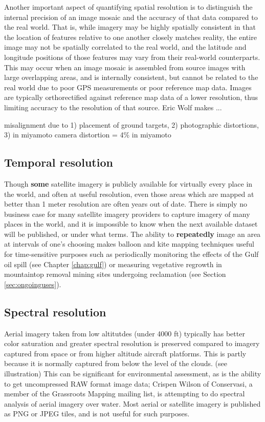 \documentclass[11pt]{report}
\begin{document}
Another important aspect of quantifying spatial resolution is to distinguish the internal precision of an image mosaic and the accuracy of that data compared to the real world. That is, while imagery may be highly spatially consistent in that the location of features relative to one another closely matches reality, the entire image may not be spatially correlated to the real world, and the latitude and longitude positions of those features may vary from their real-world counterparts. This may occur when an image mosaic is assembled from source images with large overlapping areas, and is internally consistent, but cannot be related to the real world due to poor GPS measurements or poor reference map data. Images are typically orthorectified against reference map data of a lower resolution, thus limiting accuracy to the resolution of that source. Eric Wolf makes ...


misalignment due to 1) placement of ground targets, 2) photographic distortions, 3) in miyamoto
camera distortion = 4\% in miyamoto

\subsection{Temporal resolution}

Though \textbf{some} satellite imagery is publicly available for virtually every place in the world, and often at useful resolution, even those areas which are mapped at better than 1 meter resolution are often years out of date. There is simply no business case for many satellite imagery providers to capture imagery of many places in the world, and it is impossible to know when the next available dataset will be published, or under what terms. \cite{oconnor2008maps} The ability to \textbf{repeatedly} image an area at intervals of one's choosing makes balloon and kite mapping techniques useful for time-sensitive purposes such as periodically monitoring the effects of the Gulf oil spill (see Chapter \ref{chap:gulf}) or measuring vegetative regrowth in mountaintop removal mining sites undergoing reclamation (see Section \ref{sec:ongoinguses}). 

\subsection{Spectral resolution}

Aerial imagery taken from low altitutdes (under 4000 ft) typically has better color saturation and greater spectral resolution is preserved compared to imagery captured from space or from higher altitude aircraft platforms. This is partly because it is normally captured from below the level of the clouds. (see illustration) This can be significant for environmental assessment, as is the ability to get uncompressed RAW format image data; Crispen Wilson of Conservasi, a  member of the Grassroots Mapping mailing list, is attempting to do spectral analysis of aerial imagery over water. Most aerial or satellite imagery is published as PNG or JPEG tiles, and is not useful for such purposes.  
\end{document}

